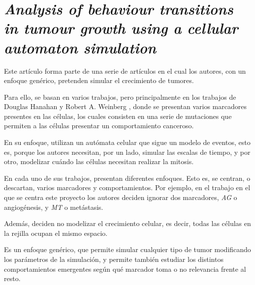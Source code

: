 \section{\textit{Analysis of behaviour transitions in tumour growth
using a cellular automaton simulation}}

Este artículo \cite{jsantos-amonteagudo-1-2014} forma parte de una serie de artículos
\cite{jsantos-amonteagudo-2012} \cite{jsantos-amonteagudo-2013} \cite{jsantos-amonteagudo-2015}
en el cual los autores, con un enfoque genérico, pretenden simular el crecimiento de
tumores.

Para ello, se basan en varios trabajos, pero principalmente en los trabajos de Douglas Hanahan y Robert A. Weinberg
\cite{hanahan-weinberg-2000} \cite{hanahan-weinberg-2011}, donde se presentan varios marcadores presentes
en las células, los cuales consisten en una serie de mutaciones que permiten a las células presentar
un comportamiento canceroso.

En su enfoque, utilizan un autómata celular que sigue un modelo de eventos, esto es, porque los autores
necesitan, por un lado, simular las escalas de tiempo, y por otro, modelizar cuándo las células necesitan
realizar la mitosis.

En cada uno de sus trabajos, presentan diferentes enfoques. Esto es, se centran, o descartan, varios marcadores y
comportamientos. Por ejemplo, en el trabajo en el que se centra este proyecto \cite{jsantos-amonteagudo-1-2014}
los autores deciden ignorar dos marcadores, \textit{AG} o angiogénesis, y \textit{MT} o metástasis.

Además, deciden no modelizar el crecimiento celular, es decir, todas las células en la rejilla ocupan
el mismo espacio.

Es un enfoque genérico, que permite simular cualquier tipo de tumor modificando los parámetros de la
simulación, y permite también estudiar los distintos comportamientos emergentes según
qué marcador toma o no relevancia frente al resto.
